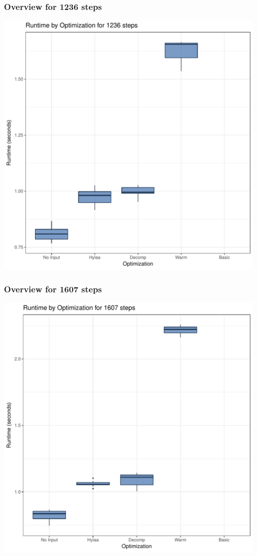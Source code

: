 \documentclass{article}\usepackage[]{graphicx}\usepackage[]{color}
\makeatletter
\def\maxwidth{ %
  \ifdim\Gin@nat@width>\linewidth
    \linewidth
  \else
    \Gin@nat@width
  \fi
}
\newenvironment{knitrout}{}{} %
\makeatother
\begin{document}
\subsubsection{Overview for 1236 steps}
\begin{knitrout}
\color{fgcolor}
\includegraphics[width=\maxwidth]{figure/steps1236-1} 

\end{knitrout}
\subsubsection{Overview for 1607 steps}
\begin{knitrout}
\color{fgcolor}
\includegraphics[width=\maxwidth]{figure/steps1607-1} 

\end{knitrout}
\end{document}

